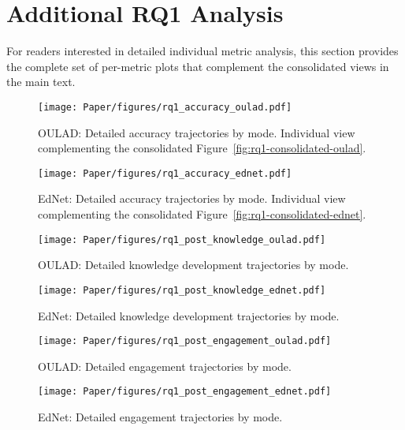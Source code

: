 \section{Additional RQ1 Analysis}
\label{app:rq1-details}

For readers interested in detailed individual metric analysis, this section provides the complete set of per-metric plots that complement the consolidated views in the main text.

\begin{figure}[!t]
  \centering
  \texttt{[image: Paper/figures/rq1\_accuracy\_oulad.pdf]}
  \caption{OULAD: Detailed accuracy trajectories by mode. Individual view complementing the consolidated Figure~\ref{fig:rq1-consolidated-oulad}.}
  \label{fig:rq1-acc-oulad-detailed}
\end{figure}

\begin{figure}[!t]
  \centering
  \texttt{[image: Paper/figures/rq1\_accuracy\_ednet.pdf]}
  \caption{EdNet: Detailed accuracy trajectories by mode. Individual view complementing the consolidated Figure~\ref{fig:rq1-consolidated-ednet}.}
  \label{fig:rq1-acc-ednet-detailed}
\end{figure}

\begin{figure}[!t]
  \centering
  \texttt{[image: Paper/figures/rq1\_post\_knowledge\_oulad.pdf]}
  \caption{OULAD: Detailed knowledge development trajectories by mode.}
  \label{fig:rq1-knowledge-oulad-detailed}
\end{figure}

\begin{figure}[!t]
  \centering
  \texttt{[image: Paper/figures/rq1\_post\_knowledge\_ednet.pdf]}
  \caption{EdNet: Detailed knowledge development trajectories by mode.}
  \label{fig:rq1-knowledge-ednet-detailed}
\end{figure}

\begin{figure}[!t]
  \centering
  \texttt{[image: Paper/figures/rq1\_post\_engagement\_oulad.pdf]}
  \caption{OULAD: Detailed engagement trajectories by mode.}
  \label{fig:rq1-engagement-oulad-detailed}
\end{figure}

\begin{figure}[!t]
  \centering
  \texttt{[image: Paper/figures/rq1\_post\_engagement\_ednet.pdf]}
  \caption{EdNet: Detailed engagement trajectories by mode.}
  \label{fig:rq1-engagement-ednet-detailed}
\end{figure}

